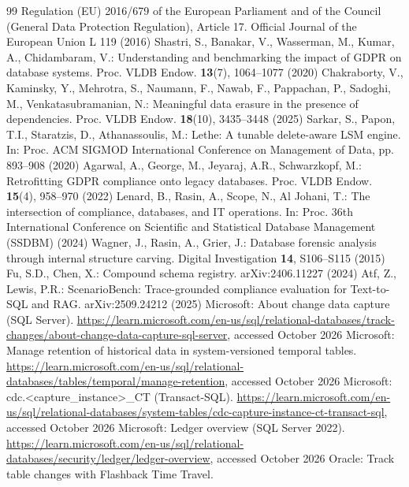 \documentclass[runningheads]{llncs}
\begin{document}
\begin{thebibliography}{99}
 Regulation (EU) 2016/679 of the European Parliament and of the
Council (General Data Protection Regulation), Article 17. Official Journal of
the European Union L 119 (2016)
 Shastri, S., Banakar, V., Wasserman, M., Kumar, A.,
Chidambaram, V.: Understanding and benchmarking the impact of GDPR on database
systems. Proc. VLDB Endow. \textbf{13}(7), 1064--1077 (2020)
 Chakraborty, V., Kaminsky, Y., Mehrotra, S., Naumann,
F., Nawab, F., Pappachan, P., Sadoghi, M., Venkatasubramanian, N.: Meaningful
data erasure in the presence of dependencies. Proc. VLDB Endow.
\textbf{18}(10), 3435--3448 (2025)
 Sarkar, S., Papon, T.I., Staratzis, D., Athanassoulis, M.:
Lethe: A tunable delete-aware LSM engine. In: Proc. ACM SIGMOD International
Conference on Management of Data, pp. 893--908 (2020)
 Agarwal, A., George, M., Jeyaraj, A.R., Schwarzkopf, M.:
Retrofitting GDPR compliance onto legacy databases. Proc. VLDB Endow.
\textbf{15}(4), 958--970 (2022)
 Lenard, B., Rasin, A., Scope, N., Al Johani, T.: The
intersection of compliance, databases, and IT operations. In: Proc. 36th
International Conference on Scientific and Statistical Database Management
(SSDBM) (2024)
 Wagner, J., Rasin, A., Grier, J.: Database forensic
analysis through internal structure carving. Digital Investigation
\textbf{14}, S106--S115 (2015)
 Fu, S.D., Chen, X.: Compound schema registry.
arXiv:2406.11227 (2024)
 Atf, Z., Lewis, P.R.: ScenarioBench: Trace-grounded
compliance evaluation for Text-to-SQL and RAG. arXiv:2509.24212 (2025)
 Microsoft: About change data capture (SQL Server).
\url{https://learn.microsoft.com/en-us/sql/relational-databases/track-changes/about-change-data-capture-sql-server},
accessed October 2026
 Microsoft: Manage retention of historical data in
system-versioned temporal tables.
\url{https://learn.microsoft.com/en-us/sql/relational-databases/tables/temporal/manage-retention},
accessed October 2026
 Microsoft: cdc.<capture\_instance>\_CT (Transact-SQL).
\url{https://learn.microsoft.com/en-us/sql/relational-databases/system-tables/cdc-capture-instance-ct-transact-sql},
accessed October 2026
 Microsoft: Ledger overview (SQL Server 2022).
\url{https://learn.microsoft.com/en-us/sql/relational-databases/security/ledger/ledger-overview},
accessed October 2026
 Oracle: Track table changes with Flashback Time Travel.

\end{thebibliography}
\end{document}
